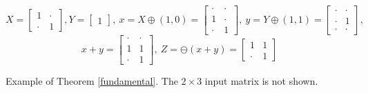\small
$$
X =
\begin{bmatrix}
1 & \cdot \\[-.2em]
\cdot & 1
\end{bmatrix}\!\!,
Y =
\begin{bmatrix}
1
\end{bmatrix}\!\!, \
x = X\oplus (1,0) =
\begin{bmatrix}
\cdot & \cdot \\[-.2em]
1 & \cdot \\[-.2em]
\cdot & 1
\end{bmatrix}\!\!, \
y = Y\oplus (1,1) =
\begin{bmatrix}
\cdot & \cdot \\[-.2em]
\cdot & 1 \\[-.2em]
\cdot & \cdot
\end{bmatrix}\!\!,
$$
$$
x + y =
\begin{bmatrix}
\cdot & \cdot \\[-.2em]
1 & 1 \\[-.2em]
\cdot & 1
\end{bmatrix}\!\!, \
Z = \ominus(x+y)=
\begin{bmatrix}
1 & 1 \\[-.2em]
\cdot & 1
\end{bmatrix}\!\!
$$
\caption{Example of Theorem \ref{fundamental}. The $2\times 3$ input matrix is not shown.}
